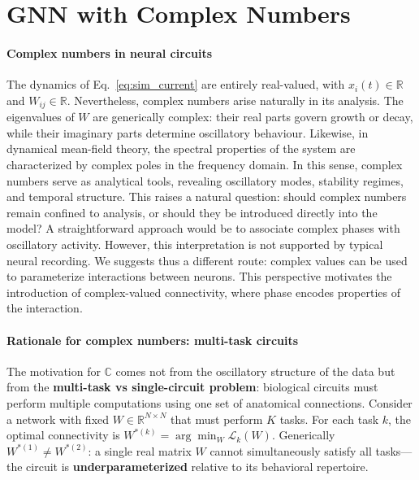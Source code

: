 \documentclass[11pt]{article}
\begin{document}
\newpage
\part{GNN with Complex Numbers}


\subsection{Complex numbers in neural circuits}
\label{sec:complex_analysis}

The dynamics of Eq.~\eqref{eq:sim_current} are entirely real-valued, with $x_i(t) \in \mathbb{R}$ and $W_{ij} \in \mathbb{R}$. Nevertheless, complex numbers arise naturally in its analysis. The eigenvalues of $W$ are generically complex: their real parts govern growth or decay, while their imaginary parts determine oscillatory behaviour. Likewise, in dynamical mean-field theory, the spectral properties of the system are characterized by complex poles in the frequency domain. In this sense, complex numbers serve as analytical tools, revealing oscillatory modes, stability regimes, and temporal structure.
This raises a natural question: should complex numbers remain confined to analysis, or should they be introduced directly into the model? A straightforward approach would be to associate complex phases with oscillatory activity. However, this interpretation is not supported by typical neural recording. We suggests thus a different route: complex values can be used to parameterize interactions between neurons. This perspective motivates the introduction of complex-valued connectivity, where phase encodes properties of the interaction.

\subsection{Rationale for complex numbers: multi-task circuits}
\label{sec:rationale}

The motivation for $\mathbb{C}$ comes not from the oscillatory structure of the data but from the \textbf{multi-task vs single-circuit problem}: biological circuits must perform multiple computations using one set of anatomical connections. Consider a network with fixed $W \in \mathbb{R}^{N\times N}$ that must perform $K$ tasks. For each task $k$, the optimal connectivity is $W^{*(k)} = \arg\min_W \mathcal{L}_k(W)$. Generically $W^{*(1)} \neq W^{*(2)}$: a single real matrix $W$ cannot simultaneously satisfy all tasks---the circuit is \textbf{underparameterized} relative to its behavioral repertoire.
\end{document}
